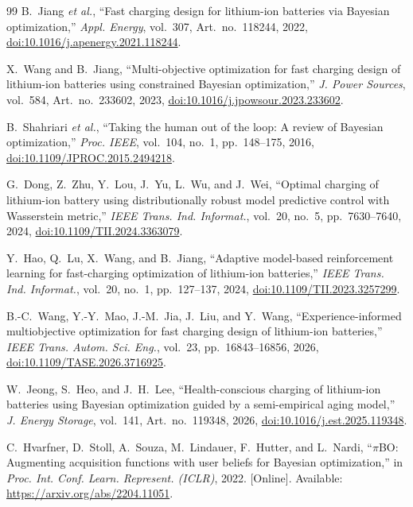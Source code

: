 \documentclass[journal,10pt]{IEEEtran}
\begin{document}
\begin{thebibliography}{99}
B.~Jiang \textit{et al.},
``Fast charging design for lithium-ion batteries via Bayesian
optimization,''
\textit{Appl. Energy}, vol.~307, Art.~no.~118244, 2022,
\href{https://doi.org/10.1016/j.apenergy.2021.118244}
{doi:10.1016/j.apenergy.2021.118244}.

X.~Wang and B.~Jiang,
``Multi-objective optimization for fast charging design of lithium-ion
batteries using constrained Bayesian optimization,''
\textit{J. Power Sources}, vol.~584, Art.~no.~233602, 2023,
\href{https://doi.org/10.1016/j.jpowsour.2023.233602}
{doi:10.1016/j.jpowsour.2023.233602}.

B.~Shahriari \textit{et al.},
``Taking the human out of the loop: A review of Bayesian optimization,''
\textit{Proc. IEEE}, vol.~104, no.~1, pp.~148--175, 2016,
\href{https://doi.org/10.1109/JPROC.2015.2494218}
{doi:10.1109/JPROC.2015.2494218}.

G.~Dong, Z.~Zhu, Y.~Lou, J.~Yu, L.~Wu, and J.~Wei,
``Optimal charging of lithium-ion battery using distributionally robust
model predictive control with Wasserstein metric,''
\textit{IEEE Trans. Ind. Informat.},
vol.~20, no.~5, pp.~7630--7640, 2024,
\href{https://doi.org/10.1109/TII.2024.3363079}
{doi:10.1109/TII.2024.3363079}.

Y.~Hao, Q.~Lu, X.~Wang, and B.~Jiang,
``Adaptive model-based reinforcement learning for fast-charging
optimization of lithium-ion batteries,''
\textit{IEEE Trans. Ind. Informat.},
vol.~20, no.~1, pp.~127--137, 2024,
\href{https://doi.org/10.1109/TII.2023.3257299}
{doi:10.1109/TII.2023.3257299}.

B.-C.~Wang, Y.-Y.~Mao, J.-M.~Jia, J.~Liu, and Y.~Wang,
``Experience-informed multiobjective optimization for fast
charging design of lithium-ion batteries,''
\textit{IEEE Trans. Autom. Sci. Eng.},
vol.~23, pp.~16843--16856, 2026,
\href{https://doi.org/10.1109/TASE.2026.3716925}
{doi:10.1109/TASE.2026.3716925}.

W.~Jeong, S.~Heo, and J.~H.~Lee,
``Health-conscious charging of lithium-ion batteries using
Bayesian optimization guided by a semi-empirical aging model,''
\textit{J. Energy Storage},
vol.~141, Art.~no.~119348, 2026,
\href{https://doi.org/10.1016/j.est.2025.119348}
{doi:10.1016/j.est.2025.119348}.

C.~Hvarfner, D.~Stoll, A.~Souza, M.~Lindauer,
F.~Hutter, and L.~Nardi,
``$\pi$BO: Augmenting acquisition functions with user beliefs
for Bayesian optimization,''
in \textit{Proc. Int. Conf. Learn. Represent. (ICLR)}, 2022.
[Online]. Available:
\url{https://arxiv.org/abs/2204.11051}.


\end{thebibliography}
\end{document}
